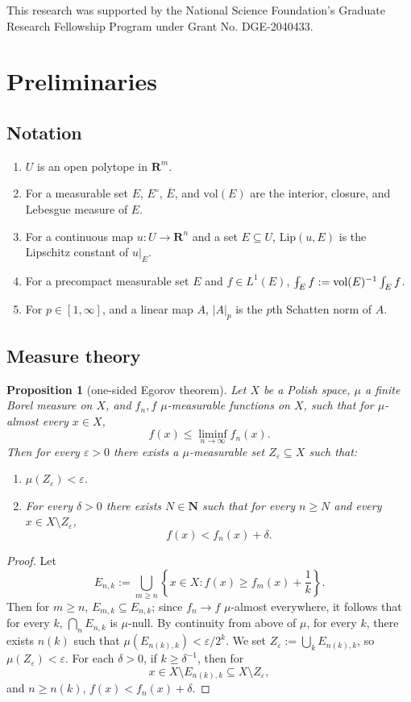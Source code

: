 \documentclass[reqno,11pt]{amsart}
\newcommand{\NN}{\mathbf{N}}
\newcommand{\RR}{\mathbf{R}}
\newcommand{\vol}{\mathrm{vol}}
\newcommand{\Lip}{\mathrm{Lip}}
\newtheorem{proposition}[theorem]{Proposition}
\theoremstyle{definition}
\numberwithin{equation}{section}
\def\Xint#1{\mathchoice
{\XXint\displaystyle\textstyle{#1}}%
{\XXint\textstyle\scriptstyle{#1}}%
{\XXint\scriptstyle\scriptscriptstyle{#1}}%
{\XXint\scriptscriptstyle\scriptscriptstyle{#1}}%
\!\int}
\def\XXint#1#2#3{{\setbox0=\hbox{$#1{#2#3}{\int}$ }
\vcenter{\hbox{$#2#3$ }}\kern-.6\wd0}}
\def\dashint{\Xint-}
\begin{document}
This research was supported by the National Science Foundation's Graduate Research Fellowship Program under Grant No. DGE-2040433.

\section{Preliminaries}
\subsection{Notation}
\begin{enumerate}
\item $U$ is an open polytope in $\RR^m$.
\item For a measurable set $E$, $E^\circ$, $\overline E$, and $\vol(E)$ are the interior, closure, and Lebesgue measure of $E$.
\item For a continuous map $u: U \to \RR^n$ and a set $E \subseteq U$, $\Lip(u, E)$ is the Lipschitz constant of $u|_E$.
\item For a precompact measurable set $E$ and $f \in L^1(E)$, $\dashint_E f := \vol(E)^{-1} \int_E f$.
\item For $p \in [1, \infty]$, and a linear map $A$, $|A|_p$ is the $p$th Schatten norm of $A$.
\end{enumerate}

\subsection{Measure theory}
\begin{proposition}[one-sided Egorov theorem]\label{one sided Egorov}
Let $X$ be a Polish space, $\mu$ a finite Borel measure on $X$, and $f_n, f$ $\mu$-measurable functions on $X$, such that for $\mu$-almost every $x \in X$,
$$f(x) \leq \liminf_{n \to \infty} f_n(x).$$
Then for every $\varepsilon > 0$ there exists a $\mu$-measurable set $Z_\varepsilon \subseteq X$ such that:
\begin{enumerate}
\item $\mu(Z_\varepsilon) < \varepsilon$.
\item For every $\delta > 0$ there exists $N \in \NN$ such that for every $n \geq N$ and every $x \in X \setminus Z_\varepsilon$,
$$f(x) < f_n(x) + \delta.$$
\end{enumerate}
\end{proposition}
\begin{proof}
Let 
$$E_{n, k} := \bigcup_{m \geq n} \left\{x \in X: f(x) \geq f_m(x) + \frac{1}{k}\right\}.$$
Then for $m \geq n$, $E_{m, k} \subseteq E_{n, k}$; since $f_n \to f$ $\mu$-almost everywhere, it follows that for every $k$, $\bigcap_n E_{n, k}$ is $\mu$-null.
By continuity from above of $\mu$, for every $k$, there exists $n(k)$ such that $\mu(E_{n(k), k}) < \varepsilon/2^k$.
We set $Z_\varepsilon := \bigcup_k E_{n(k), k}$, so $\mu(Z_\varepsilon) < \varepsilon$.
For each $\delta > 0$, if $k \geq \delta^{-1}$, then for
$$x \in X \setminus E_{n(k), k} \subseteq X \setminus Z_\varepsilon,$$
and $n \geq n(k)$, $f(x) < f_n(x) + \delta$.
\end{proof}
\end{document}
